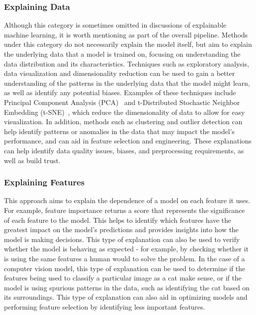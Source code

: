 \documentclass[graybox]{svmult}
\newcommand\todo[1]{\textcolor{red}{TODO: #1}}
\begin{document}
\subsubsection{Explaining Data}
Although this category is sometimes omitted in discussions of explainable machine learning, 
it is worth mentioning as part of the overall pipeline. Methods under this category do not necessarily explain the model itself, but aim to explain the underlying data that a model is trained on, focusing on understanding the data distribution and its characteristics. Techniques such as exploratory analysis, data visualization and dimensionality reduction can be used to gain a better understanding of the patterns in the underlying data that the model might learn, as well as identify any potential biases. Examples of these techniques include Principal Component Analysis (PCA)~\cite{pearsonLIIILinesPlanes1901, hotellingAnalysisComplexStatistical1933} and t-Distributed Stochastic Neighbor Embedding (t-SNE)~\cite{maatenVisualizingDataUsing2008}, which reduce the dimensionality of data to allow for easy visualization. In addition, methods such as clustering and outlier detection can help identify patterns or anomalies in the data that may impact the model's performance, and can aid in feature selection and engineering. These explanations can help identify data quality issues, biases, and preprocessing requirements, as well as build trust.


\subsubsection{Explaining Features}
This approach aims to explain the dependence of a model on each feature it uses. 
For example, feature importance returns a score 
that represents the significance of each feature to the model. 
This helps to identify which features have the greatest impact on the model's predictions 
and provides insights into how the model is making decisions. 
This type of explanation can also be used to verify whether the model is behaving as expected 
- for example, by checking whether it is using the same features a human would to solve the problem. 
In the case of a computer vision model, 
this type of explanation can be used to determine 
if the features being used to classify a particular image as a cat make sense, 
or if the model is using spurious patterns in the data, 
such as identifying the cat based on its surroundings. 
This type of explanation can also aid in optimizing models 
and performing feature selection by identifying less important features.
\end{document}
